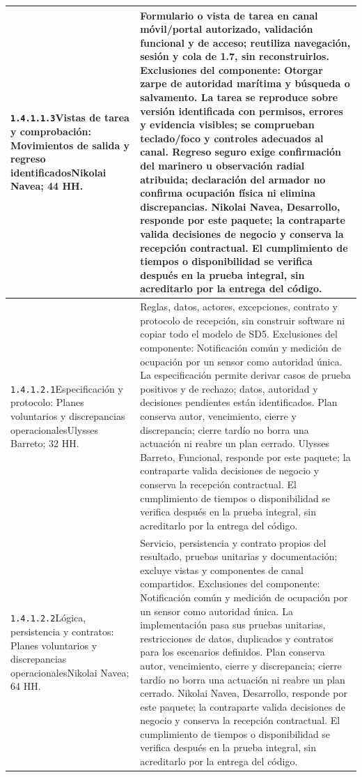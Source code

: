 \begin{longtable}{L{52mm}L{91mm}}
\texttt{1.\allowbreak{}4.\allowbreak{}1.\allowbreak{}1.\allowbreak{}3}\newline Vistas de tarea y comprobación: Movimientos de salida y regreso identificados\newline Nikolai Navea; 44 HH. & Formulario o vista de tarea en canal móvil/portal autorizado, validación funcional y de acceso; reutiliza navegación, sesión y cola de 1.7, sin reconstruirlos. Exclusiones del componente: Otorgar zarpe de autoridad marítima y búsqueda o salvamento. La tarea se reproduce sobre versión identificada con permisos, errores y evidencia visibles; se comprueban teclado/foco y controles adecuados al canal. Regreso seguro exige confirmación del marinero u observación radial atribuida; declaración del armador no confirma ocupación física ni elimina discrepancias. Nikolai Navea, Desarrollo, responde por este paquete; la contraparte valida decisiones de negocio y conserva la recepción contractual. El cumplimiento de tiempos o disponibilidad se verifica después en la prueba integral, sin acreditarlo por la entrega del código.\\\hline
\texttt{1.\allowbreak{}4.\allowbreak{}1.\allowbreak{}2.\allowbreak{}1}\newline Especificación y protocolo: Planes voluntarios y discrepancias operacionales\newline Ulysses Barreto; 32 HH. & Reglas, datos, actores, excepciones, contrato y protocolo de recepción, sin construir software ni copiar todo el modelo de SD5. Exclusiones del componente: Notificación común y medición de ocupación por un sensor como autoridad única. La especificación permite derivar casos de prueba positivos y de rechazo; datos, autoridad y decisiones pendientes están identificados. Plan conserva autor, vencimiento, cierre y discrepancia; cierre tardío no borra una actuación ni reabre un plan cerrado. Ulysses Barreto, Funcional, responde por este paquete; la contraparte valida decisiones de negocio y conserva la recepción contractual. El cumplimiento de tiempos o disponibilidad se verifica después en la prueba integral, sin acreditarlo por la entrega del código.\\\hline
\texttt{1.\allowbreak{}4.\allowbreak{}1.\allowbreak{}2.\allowbreak{}2}\newline Lógica, persistencia y contratos: Planes voluntarios y discrepancias operacionales\newline Nikolai Navea; 64 HH. & Servicio, persistencia y contrato propios del resultado, pruebas unitarias y documentación; excluye vistas y componentes de canal compartidos. Exclusiones del componente: Notificación común y medición de ocupación por un sensor como autoridad única. La implementación pasa sus pruebas unitarias, restricciones de datos, duplicados y contratos para los escenarios definidos. Plan conserva autor, vencimiento, cierre y discrepancia; cierre tardío no borra una actuación ni reabre un plan cerrado. Nikolai Navea, Desarrollo, responde por este paquete; la contraparte valida decisiones de negocio y conserva la recepción contractual. El cumplimiento de tiempos o disponibilidad se verifica después en la prueba integral, sin acreditarlo por la entrega del código.\\\hline

\end{longtable}
